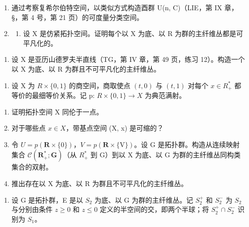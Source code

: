 \begin{enumerate}
\def\labelenumi{\arabic{enumi})}
\setcounter{enumi}{3}
\item
  通过考察复希尔伯特空间，以类似方式构造酉群 U(n, C)（LIE，第 IX 章，§，第 4 号，第 21 页）的可度量分类空间。
\item
  \begin{enumerate}
  \def\labelenumii{\alph{enumii})}
  \tightlist
  \item
    设 X 是仿紧拓扑空间。证明每个以 X 为底、以 R 为群的主纤维丛都是可平凡化的。
  \end{enumerate}
\end{enumerate}

\begin{enumerate}
\def\labelenumi{\alph{enumi})}
\setcounter{enumi}{1}
\tightlist
\item
  设 X 是亚历山德罗夫半直线（TG，第 IV 章，第 49 页，练习 12）。构造一个以 X 为底、以 R 为群且不可平凡化的主纤维丛。
\end{enumerate}

\begin{enumerate}
\def\labelenumi{\arabic{enumi})}
\setcounter{enumi}{5}
\tightlist
\item
  设 X 为 \(R \times \{0,1\}\) 的商空间，商取使点 \((t,0)\) 与 \((t,1)\) 对每个 \(x \in R_{+}^{*}\) 都等价的最细等价关系。记 p: \(R \times \{0,1\} \to X\) 为典范满射。
\end{enumerate}

\begin{enumerate}
\def\labelenumi{\alph{enumi})}
\item
  证明拓扑空间 X 同伦于一点。
\item
  对于哪些点 \(x \in X\)，带基点空间 (X, x) 是可缩的？
\item
  令 \(U = p(\mathbf{R} \times \{0\})\)，\(V = p(\mathbf{R} \times \{\mathrm{V}\})\)。设 G 是拓扑群。构造从连续映射集合 \(\mathcal{C}(\mathbf{R}_{+}^{*}; \mathbf{G})\)（从 \(R_{+}^{*}\) 到 G）到以 X 为底、以 G 为群的主纤维丛同构类集合的双射。
\item
  推出存在以 X 为底、以 R 为群且不可平凡化的主纤维丛。
\end{enumerate}

\begin{enumerate}
\def\labelenumi{\arabic{enumi})}
\setcounter{enumi}{6}
\tightlist
\item
  设 G 是拓扑群，E 是以 \(S_{2}\) 为底、以 G 为群的主纤维丛。记 \(S_{2}^{+}\) 和 \(S_{2}^{-}\) 为 \(S_{2}\) 与分别由条件 \(z \geqslant 0\) 和 \(z \leqslant 0\) 定义的半空间的交，即两个半球；将 \(S_{2}^{+} \cap S_{2}^{-}\) 识别为 \(S_{1}\)。
\end{enumerate}

